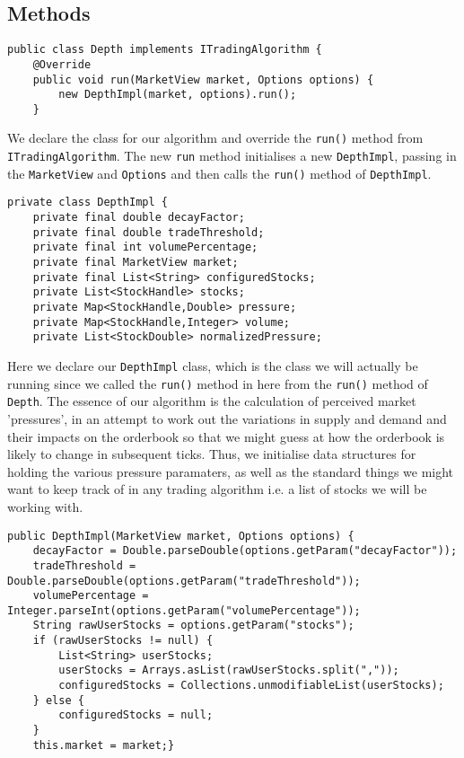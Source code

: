 \documentclass[11pt]{article}
\begin{document}
\subsection{Methods}
\begin{lstlisting}
public class Depth implements ITradingAlgorithm {
	@Override
	public void run(MarketView market, Options options) {
		new DepthImpl(market, options).run();
	}
\end{lstlisting}
We declare the class for our algorithm and override the \texttt{run()} method from \texttt{ITradingAlgorithm}. The new \texttt{run{}} method initialises a new \texttt{DepthImpl}, passing in the \texttt{MarketView} and \texttt{Options} and then calls the \texttt{run()} method of \texttt{DepthImpl}.
\begin{lstlisting}
private class DepthImpl {
	private final double decayFactor;
	private final double tradeThreshold;
	private final int volumePercentage;
	private final MarketView market;
	private final List<String> configuredStocks;
	private List<StockHandle> stocks;
	private Map<StockHandle,Double> pressure;
	private Map<StockHandle,Integer> volume;
	private List<StockDouble> normalizedPressure;
\end{lstlisting}
Here we declare our \texttt{DepthImpl} class, which is the class we will actually be running since we called the \texttt{run()} method in here from the \texttt{run()} method of \texttt{Depth}. The essence of our algorithm is the calculation of perceived market 'pressures', in an attempt to work out the variations in supply and demand and their impacts on the orderbook so that we might guess at how the orderbook is likely to change in subsequent ticks. Thus, we initialise data structures for holding the various pressure paramaters, as well as the standard things we might want to keep track of in any trading algorithm i.e. a list of stocks we will be working with.\\
\begin{lstlisting}
public DepthImpl(MarketView market, Options options) {
	decayFactor = Double.parseDouble(options.getParam("decayFactor"));
	tradeThreshold = Double.parseDouble(options.getParam("tradeThreshold"));
	volumePercentage = Integer.parseInt(options.getParam("volumePercentage"));			
	String rawUserStocks = options.getParam("stocks");
	if (rawUserStocks != null) {
		List<String> userStocks;
		userStocks = Arrays.asList(rawUserStocks.split(","));
		configuredStocks = Collections.unmodifiableList(userStocks);
	} else {
		configuredStocks = null;
	}			
	this.market = market;}	
\end{lstlisting}
\end{document}
